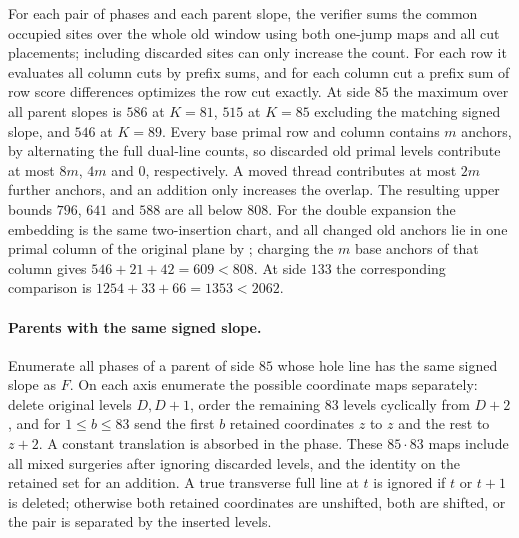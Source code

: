 \documentclass[11pt,colorlinks]{charlie}
\begin{document}
For each pair of phases and each parent slope, the verifier sums the common occupied sites over the whole old window using both one-jump maps and all cut placements; including discarded sites can only increase the count. For each row it evaluates all column cuts by prefix sums, and for each column cut a prefix sum of row score differences optimizes the row cut exactly. At side $85$ the maximum over all parent slopes is $586$ at $K=81$, $515$ at $K=85$ excluding the matching signed slope, and $546$ at $K=89$. Every base primal row and column contains $m$ anchors, by alternating the full dual-line counts, so discarded old primal levels contribute at most $8m$, $4m$ and $0$, respectively. A moved thread contributes at most $2m$ further anchors, and an addition only increases the overlap. The resulting upper bounds $796$, $641$ and $588$ are all below $808$. For the double expansion the embedding is the same two-insertion chart, and all changed old anchors lie in one primal column of the original plane by ; charging the $m$ base anchors of that column gives $546+21+42=609<808$. At side $133$ the corresponding comparison is $1254+33+66=1353<2062$.

\paragraph{Parents with the same signed slope.}
Enumerate all phases of a parent of side $85$ whose hole line has the same signed slope as $F$. On each axis enumerate the possible coordinate maps separately: delete original levels $D,D+1$, order the remaining $83$ levels cyclically from $D+2$, and for $1\le b\le83$ send the first $b$ retained coordinates $z$ to $z$ and the rest to $z+2$. A constant translation is absorbed in the phase. These $85\cdot83$ maps include all mixed surgeries after ignoring discarded levels, and the identity on the retained set for an addition. A true transverse full line at $t$ is ignored if $t$ or $t+1$ is deleted; otherwise both retained coordinates are unshifted, both are shifted, or the pair is separated by the inserted levels.
\end{document}
